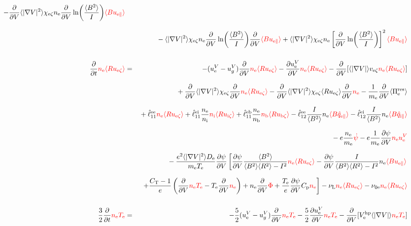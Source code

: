 \documentclass[11pt]{article}
\def\r#1{{\rm#1}}
\def\aves#1{\langle#1\rangle}
\def\dd#1#2{\frac{\partial #1}{\partial #2}}
\def\para{\parallel}
\def\ddV{\frac{\partial}{\partial V}}
\def\psid{\dot{\psi}}
\def\me{m_\r{e}}
\def\nee{n_\r{e}}
\def\ni{n_\r{i}}
\def\nb{n_\r{b}}
\def\Te{T_\r{e}}
\def\uezt{u_{\r{e}\zeta}}
\def\uizt{u_{\r{i}\zeta}}
\def\ubzt{u_{\r{b}\zeta}}
\def\uepara{u_{\r{e}\para}}
\def\ubpara{u_{\r{b}\para}}
\def\qhatepara{\hat{q}_{\r{e}\para}}
\def\qhatipara{\hat{q}_{\r{i}\para}}
\def\ueV{u_\r{e}^V}
\def\ugV{u_{g}^V}
\def\bri{\aves{B^2}\aves{R^2} - I^2}
\def\ddt{\frac{\partial}{\partial t}}
\def\De{D_\r{e}}
\def\nune{\nu_\r{0e}}
\def\nuL{\nu_\r{L}}
\def\red#1{\textcolor{red}{#1}}
\begin{document}
\begin{eqnarray}
%
  - \ddV \aves{|\nabla V|^2} \chi_{\r{e}\zeta} \nee \ddV
  \ln\biggl(\frac{\aves{B^2}}{I}\biggr) \red{\aves{B \uepara}}
\nonumber\\[3mm]&&{}
%
  - \aves{|\nabla V|^2} \chi_{\r{e}\zeta} \nee \ddV
  \ln\biggl(\frac{\aves{B^2}}{I}\biggr) \ddV \red{\aves{B
  \uepara}}
%
  + \aves{|\nabla V|^2} \chi_{\r{e}\zeta} \nee \left[\ddV
  \ln\biggl(\frac{\aves{B^2}}{I}\biggr)\right]^2 \red{\aves{B \uepara}}
\\[5mm]
 \ddt \red{\nee \aves{R \uezt}} &=&
%
  - (\ueV - \ugV) \ddV \red{\nee \aves{R \uezt}}
%
  - \dd{\ueV}{V} \red{\nee \aves{R \uezt}}
%
  - \ddV [\aves{|\nabla V|} v_{\r{e}\zeta} \red{\nee \aves{R \uezt}}]
\nonumber\\[3mm]&&{}
  + \ddV \aves{|\nabla V|^2} \chi_{\r{e}\zeta} \ddV \red{\nee \aves{R \uezt}}
  - \ddV \aves{|\nabla V|^2} \chi_{\r{e}\zeta} \aves{R \uezt} \ddV \red{\nee}
  - \frac{1}{\me} \ddV \aves{\Pi_\r{e}^\r{res}}
\nonumber\\[2.5mm]&&{}
%
  + \hat{\ell}_{11}^\r{ee} \red{\nee \aves{R \uezt}}
  + \hat{\ell}_{11}^\r{ei} \frac{\nee}{\ni} \red{\ni \aves{R \uizt}}
  + \hat{\ell}_{11}^\r{eb} \frac{\nee}{\nb} \red{\nb \aves{R \ubzt}}
%
  - \hat{\ell}_{12}^\r{ee} \frac{I}{\aves{B^2}} \nee \red{\aves{B \qhatepara}}
  - \hat{\ell}_{12}^\r{ei} \frac{I}{\aves{B^2}} \nee \red{\aves{B \qhatipara}}
\nonumber\\[2.5mm]&&{}
%
  - e \frac{\nee}{\me} \red{\psid}
%
  - e \frac{1}{\me} \dd{\psi}{V} \red{\nee \ueV}
%
\nonumber\\[2.5mm]&&{}
%
  - \frac{e^2 \aves{|\nabla V|^2} \De}{\me\Te} \dd{\psi}{V} 
%
    \left[  \dd{\psi}{V} \frac{\aves{B^2}}{\bri} \red{\nee \aves{R \uezt}}
%
          - \dd{\psi}{V} \frac{I}{\bri} \nee \red{\aves{B \uepara}} \right.
\nonumber\\[2.5mm]&&{}
%
    \left.+ \frac{C_\r{T}-1}{e} \left( \ddV \red{\nee \Te} - \Te \ddV \red{\nee} \right)
%
	  + \nee \ddV \red{\Phi}
%
	  + \frac{\Te}{e} \dd{\psi}{V} C_\r{p} \red{\nee} \right]
  - \nuL  \red{\nee \aves{R \uezt}}
%
  - \nune \red{\nee \aves{R \uezt}}
\\[5mm]
 \frac{3}{2} \ddt \red{\nee \Te} &=& 
%
  - \frac{5}{2} ( \ueV - \ugV ) \ddV \red{\nee \Te}
%
  - \frac{5}{2} \dd{\ueV}{V} \red{\nee \Te}
%
  - \ddV [V_\r{e}^\r{hp} \aves{|\nabla V|}   \red{\nee \Te}]

\end{eqnarray}
\end{document}
